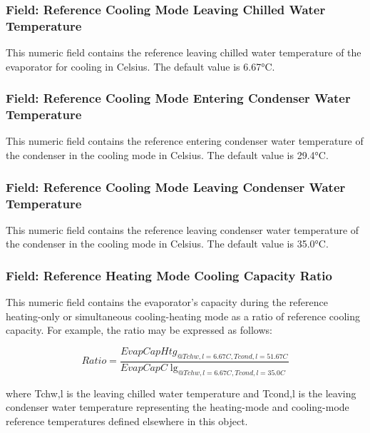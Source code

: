\subsubsection{Field: Reference Cooling Mode Leaving Chilled Water Temperature}\label{field-reference-cooling-mode-leaving-chilled-water-temperature}

This numeric field contains the reference leaving chilled water temperature of the evaporator for cooling in Celsius. The default value is 6.67°C.

\subsubsection{Field: Reference Cooling Mode Entering Condenser Water Temperature}\label{field-reference-cooling-mode-entering-condenser-water-temperature}

This numeric field contains the reference entering condenser water temperature of the condenser in the cooling mode in Celsius. The default value is 29.4°C.

\subsubsection{Field: Reference Cooling Mode Leaving Condenser Water Temperature}\label{field-reference-cooling-mode-leaving-condenser-water-temperature}

This numeric field contains the reference leaving condenser water temperature of the condenser in the cooling mode in Celsius. The default value is 35.0°C.

\subsubsection{Field: Reference Heating Mode Cooling Capacity Ratio}\label{field-reference-heating-mode-cooling-capacity-ratio}

This numeric field contains the evaporator's capacity during the reference heating-only or simultaneous cooling-heating mode as a ratio of reference cooling capacity. For example, the ratio may be expressed as follows:

\begin{equation}
Ratio = \frac{{EvapCapHt{g_{@Tchw,l = 6.67C,Tcond,l = 51.67C}}}}{{EvapCapC{{\lg }_{@Tchw,l = 6.67C,Tcond,l = 35.0C}}}}
\end{equation}

where Tchw,l is the leaving chilled water temperature and Tcond,l is the leaving condenser water temperature representing the heating-mode and cooling-mode reference temperatures defined elsewhere in this object.

